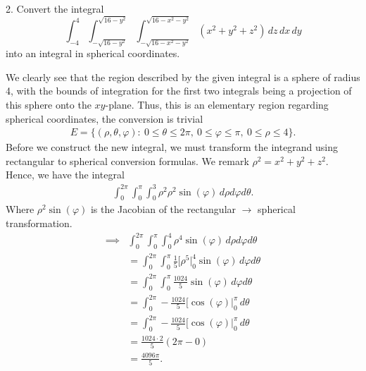 \documentclass{report}
\begin{document}
    \bigbreak \noindent 
    \begin{mdframed}
        2. Convert the integral
        \[
            \int_{-4}^{4} \int_{-\sqrt{16-y^2}}^{\sqrt{16-y^2}} \int_{-\sqrt{16-x^2-y^2}}^{\sqrt{16-x^2-y^2}} \left( x^2 + y^2 + z^2 \right) \,dz\,dx\,dy
        \]
        into an integral in spherical coordinates.
    \end{mdframed}
    \bigbreak \noindent 
    We clearly see that the region described by the given integral is a sphere of radius 4, with the bounds of integration for the first two integrals being a projection of this sphere onto the $xy$-plane. Thus, this is an elementary region regarding spherical coordinates, the conversion is trivial
    \begin{align*}
        E = \{(\rho, \theta, \varphi):\ 0 \leq \theta  \leq 2\pi,\ 0 \leq \varphi \leq \pi,\ 0 \leq \rho \leq 4\}
    .\end{align*}
    \bigbreak \noindent 
    Before we construct the new integral, we must transform the integrand using rectangular to spherical conversion formulas. We remark $\rho^{2} = x^{2} + y^{2} + z^{2}$. Hence, we have the integral
    \begin{align*}
        \int_{0}^{2\pi }\int_{0}^{\pi }\int_{0}^{3} \rho^{2}\rho^{2}\sin{\left(\varphi\right)} \, d\rho d\varphi d\theta 
    .\end{align*}
    \bigbreak \noindent 
    Where $\rho^{2}\sin{\left(\varphi\right)} $ is the Jacobian of the rectangular $\rightarrow$ spherical transformation.
    \begin{align*}
        \implies&\int_{0}^{2\pi }\int_{0}^{\pi }\int_{0}^{4} \rho^{4}\sin{\left(\varphi\right)} \, d\rho d\varphi d\theta  \\
                &=\int_{0}^{2\pi }\int_{0}^{\pi }\frac{1}{5}\bigg[\rho^{5}\bigg|_0^{4}\sin{\left(\varphi\right)} \,d\varphi d\theta  \\
                &=\int_{0}^{2\pi }\int_{0}^{\pi }\frac{1024}{5}\sin{\left(\varphi\right)} \,d\varphi d\theta  \\
                &=\int_{0}^{2\pi }-\frac{1024}{5}\bigg[\cos{\left(\varphi\right)}\bigg|_{0}^{\pi}\,d\theta  \\
                &=\int_{0}^{2\pi }-\frac{1024}{5}\bigg[\cos{\left(\varphi\right)}\bigg|_{0}^{\pi}\,d\theta  \\
                &=\frac{1024 \cdot  2}{5}(2\pi - 0) \\
                &=\frac{4096\pi}{5}
    .\end{align*}
\end{document}
